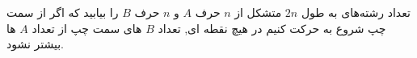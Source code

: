 \begin{PROBLEM}
    تعداد رشته‌های به طول 
    $2n$
    متشکل از
    $n$
    حرف 
  $A$
    و
    $n$
    حرف
  $B$
    را بیابید که اگر از سمت چپ شروع به حرکت کنیم در هیچ نقطه ای, تعداد 
  $B$
   ‌های سمت چپ از تعداد 
  $A$
  ‌ها بیشتر نشود.
  \end{PROBLEM}